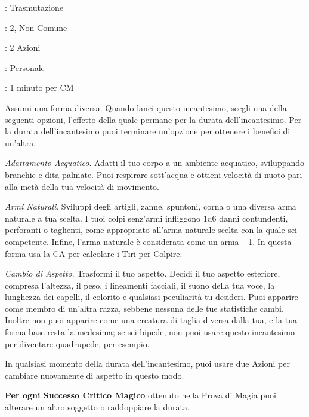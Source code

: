 \begin{multicols}{2}
\label{Alter Self}
\noindent\colorbox{OBSSgold!10}{
\begin{minipage}{0.95\linewidth}
\begin{description}[noitemsep, topsep=0pt, parsep=0pt, partopsep=0pt, leftmargin=0cm, labelwidth=2.8cm, labelsep=0.2cm]
\item[\textbf{Lista}]: Trasmutazione
\item[\textbf{Livello}]: 2, Non Comune
\item[\textbf{Lancio}]: 2 Azioni
\item[\textbf{Gittata}]: Personale
\item[\textbf{Durata}]: 1 minuto per CM
\end{description}
\end{minipage}}\smallskip

Assumi una forma diversa. Quando lanci questo incantesimo, scegli una della seguenti opzioni, l'effetto della quale permane per la durata dell'incantesimo. Per la durata dell'incantesimo puoi terminare un'opzione per ottenere i benefici di un'altra.

\emph{Adattamento Acquatico}. Adatti il tuo corpo a un ambiente acquatico, sviluppando branchie e dita palmate. Puoi respirare sott'acqua e ottieni velocità di nuoto pari alla metà della tua velocità di movimento.

\emph{Armi Naturali}. Sviluppi degli artigli, zanne, spuntoni, corna o una diversa arma naturale a tua scelta. I tuoi colpi senz'armi infliggono 1d6 danni contundenti, perforanti o taglienti, come appropriato all'arma naturale scelta con la quale sei competente. Infine, l'arma naturale è considerata come un arma +1. In questa forma usa la CA per calcolare i Tiri per Colpire.

\emph{Cambio di Aspetto}. Trasformi il tuo aspetto. Decidi il tuo aspetto esteriore, compresa l'altezza, il peso, i lineamenti facciali, il suono della tua voce, la lunghezza dei capelli, il colorito e qualsiasi peculiarità tu desideri. Puoi apparire come membro di un'altra razza, sebbene nessuna delle tue statistiche cambi. Inoltre non puoi apparire come una creatura di taglia diversa dalla tua, e la tua forma base resta la medesima; se sei bipede, non puoi usare questo incantesimo per diventare quadrupede, per esempio.

In qualsiasi momento della durata dell'incantesimo, puoi usare due Azioni per cambiare nuovamente di aspetto in questo modo.

\textbf{Per ogni Successo Critico Magico} ottenuto nella Prova di Magia puoi alterare un altro soggetto o raddoppiare la durata.


\end{multicols}

